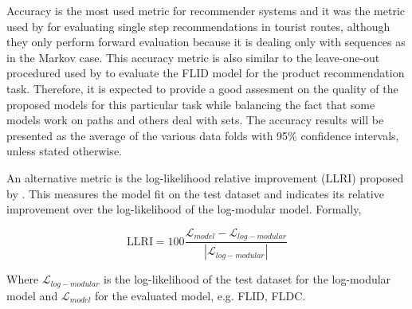 Accuracy is the most used metric for recommender systems \citep{Herlocker2004} and it was the metric used by \citet{Kurashima2010} for evaluating single step recommendations in tourist routes, although they only perform forward evaluation because it is dealing only with sequences as in the Markov case. This accuracy metric is also similar to the leave-one-out procedured used by \citet{tschiatschek16learning} to evaluate the FLID model for the product recommendation task. Therefore, it is expected to provide a good assesment on the quality of the proposed models for this particular task while balancing the fact that some models work on paths and others deal with sets. The accuracy results will be presented as the average of the various data folds with 95\% confidence intervals, unless stated otherwise.

An alternative metric is the log-likelihood relative improvement (LLRI) proposed by \citet{tschiatschek16learning}. This measures the model fit on the test dataset and indicates its relative improvement over the log-likelihood of the log-modular model. Formally,

\begin{equation}
  \mathrm{LLRI} = 100\frac{\mathcal{L}_{model} - \mathcal{L}_{log-modular}}{|\mathcal{L}_{log-modular}|}
\end{equation}

Where $\mathcal{L}_{log-modular}$ is the log-likelihood of the test dataset for the log-modular model and  $\mathcal{L}_{model}$ for the evaluated model, e.g. FLID, FLDC.